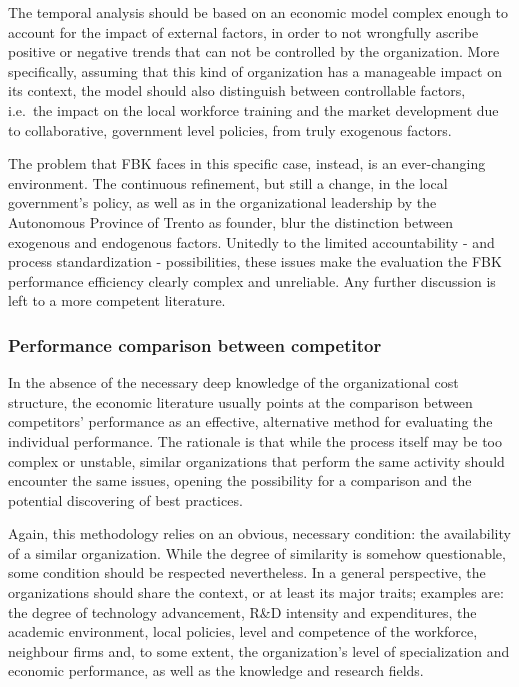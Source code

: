 The temporal analysis should be based on an economic model complex enough to account for the impact of external factors, in order to not wrongfully ascribe positive or negative trends that can not be controlled by the organization. More specifically, assuming that this kind of organization has a manageable impact on its context, the model should also distinguish between controllable factors, i.e.\ the impact on the local workforce training and the market development due to collaborative, government level policies, from truly exogenous factors.

The problem that FBK faces in this specific case, instead, is an ever-changing environment. The continuous refinement, but still a change, in the local government's policy, as well as in the organizational leadership by the Autonomous Province of Trento as founder, blur the distinction between exogenous and endogenous factors. Unitedly to the limited accountability - and process standardization - possibilities, these issues make the evaluation the FBK performance efficiency clearly complex and unreliable. Any further discussion is left to a more competent literature.

\subsubsection{Performance comparison between competitor}

In the absence of the necessary deep knowledge of the organizational cost structure, the economic literature usually points at the comparison between competitors' performance as an effective, alternative method for evaluating the individual performance. The rationale is that while the process itself may be too complex or unstable, similar organizations that perform the same activity should encounter the same issues, opening the possibility for a comparison and the potential discovering of best practices.

Again, this methodology relies on an obvious, necessary condition: the availability of a similar organization. While the degree of similarity is somehow questionable, some condition should be respected nevertheless. In a general perspective, the organizations should share the context, or at least its major traits; examples are: the degree of technology advancement, R\&D intensity and expenditures, the academic environment, local policies, level and competence of the workforce, neighbour firms and, to some extent, the organization's level of specialization and economic performance, as well as the knowledge and research fields.

